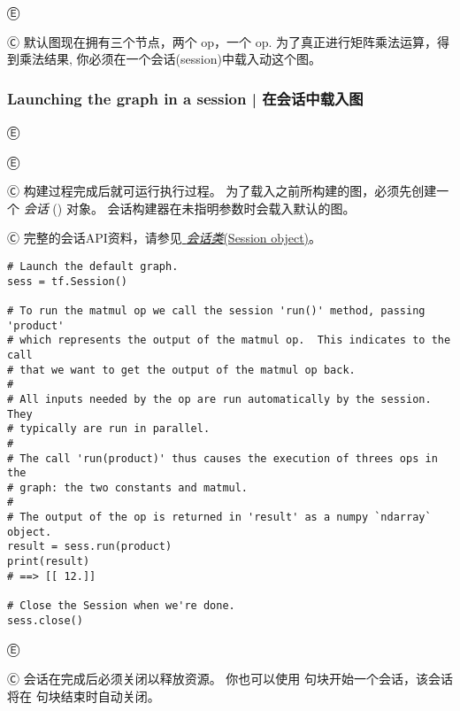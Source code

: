 Ⓔ 

Ⓒ 默认图现在拥有三个节点，两个  op，一个  op. 为了真正进行矩阵乘法运算，得到乘法结果, 你必须在一个会话(session)中载入动这个图。


\subsubsection {Launching the graph in a session  |  在会话中载入图} \label{launching_graph}

Ⓔ 

Ⓔ 

Ⓒ 构建过程完成后就可运行执行过程。  为了载入之前所构建的图，必须先创建一个 {\em 会话} () 对象。  会话构建器在未指明参数时会载入默认的图。

Ⓒ 完整的会话API资料，请参见\hyperref[class-tf.session]{ {\em 会话类}(Session object)}。

\begin{lstlisting}
# Launch the default graph.
sess = tf.Session()

# To run the matmul op we call the session 'run()' method, passing 'product'
# which represents the output of the matmul op.  This indicates to the call
# that we want to get the output of the matmul op back.
#
# All inputs needed by the op are run automatically by the session.  They
# typically are run in parallel.
#
# The call 'run(product)' thus causes the execution of threes ops in the
# graph: the two constants and matmul.
#
# The output of the op is returned in 'result' as a numpy `ndarray` object.
result = sess.run(product)
print(result)
# ==> [[ 12.]]

# Close the Session when we're done.
sess.close()
\end{lstlisting}

Ⓔ 

Ⓒ 会话在完成后必须关闭以释放资源。  你也可以使用 句块开始一个会话，该会话将在 句块结束时自动关闭。

